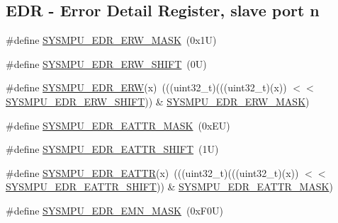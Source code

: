 \subsection*{E\+DR -\/ Error Detail Register, slave port n}
\begin{DoxyCompactItemize}
\item 
\#define \mbox{\hyperlink{group___s_y_s_m_p_u___register___masks_ga3c4ae997c305852f070d00553649fce6}{S\+Y\+S\+M\+P\+U\+\_\+\+E\+D\+R\+\_\+\+E\+R\+W\+\_\+\+M\+A\+SK}}~(0x1\+U)
\item 
\#define \mbox{\hyperlink{group___s_y_s_m_p_u___register___masks_gaae93e1aa7891872249873e1df1676ac8}{S\+Y\+S\+M\+P\+U\+\_\+\+E\+D\+R\+\_\+\+E\+R\+W\+\_\+\+S\+H\+I\+FT}}~(0\+U)
\item 
\#define \mbox{\hyperlink{group___s_y_s_m_p_u___register___masks_ga78ec31c5a6e224f900264c2cdcbeb35f}{S\+Y\+S\+M\+P\+U\+\_\+\+E\+D\+R\+\_\+\+E\+RW}}(x)~(((uint32\+\_\+t)(((uint32\+\_\+t)(x)) $<$$<$ \mbox{\hyperlink{group___s_y_s_m_p_u___register___masks_gaae93e1aa7891872249873e1df1676ac8}{S\+Y\+S\+M\+P\+U\+\_\+\+E\+D\+R\+\_\+\+E\+R\+W\+\_\+\+S\+H\+I\+FT}})) \& \mbox{\hyperlink{group___s_y_s_m_p_u___register___masks_ga3c4ae997c305852f070d00553649fce6}{S\+Y\+S\+M\+P\+U\+\_\+\+E\+D\+R\+\_\+\+E\+R\+W\+\_\+\+M\+A\+SK}})
\item 
\#define \mbox{\hyperlink{group___s_y_s_m_p_u___register___masks_ga521311a1fb6faf3494b411de8e3bdc58}{S\+Y\+S\+M\+P\+U\+\_\+\+E\+D\+R\+\_\+\+E\+A\+T\+T\+R\+\_\+\+M\+A\+SK}}~(0x\+E\+U)
\item 
\#define \mbox{\hyperlink{group___s_y_s_m_p_u___register___masks_ga1f9663f3fe817691b67c0de632ef4ff3}{S\+Y\+S\+M\+P\+U\+\_\+\+E\+D\+R\+\_\+\+E\+A\+T\+T\+R\+\_\+\+S\+H\+I\+FT}}~(1\+U)
\item 
\#define \mbox{\hyperlink{group___s_y_s_m_p_u___register___masks_ga3c9ca97a0120d6618085c99c2d5452ce}{S\+Y\+S\+M\+P\+U\+\_\+\+E\+D\+R\+\_\+\+E\+A\+T\+TR}}(x)~(((uint32\+\_\+t)(((uint32\+\_\+t)(x)) $<$$<$ \mbox{\hyperlink{group___s_y_s_m_p_u___register___masks_ga1f9663f3fe817691b67c0de632ef4ff3}{S\+Y\+S\+M\+P\+U\+\_\+\+E\+D\+R\+\_\+\+E\+A\+T\+T\+R\+\_\+\+S\+H\+I\+FT}})) \& \mbox{\hyperlink{group___s_y_s_m_p_u___register___masks_ga521311a1fb6faf3494b411de8e3bdc58}{S\+Y\+S\+M\+P\+U\+\_\+\+E\+D\+R\+\_\+\+E\+A\+T\+T\+R\+\_\+\+M\+A\+SK}})
\item 
\#define \mbox{\hyperlink{group___s_y_s_m_p_u___register___masks_ga7976b6fa8a2e6072faf02766c930d637}{S\+Y\+S\+M\+P\+U\+\_\+\+E\+D\+R\+\_\+\+E\+M\+N\+\_\+\+M\+A\+SK}}~(0x\+F0\+U)
\item 

\end{DoxyCompactItemize}
